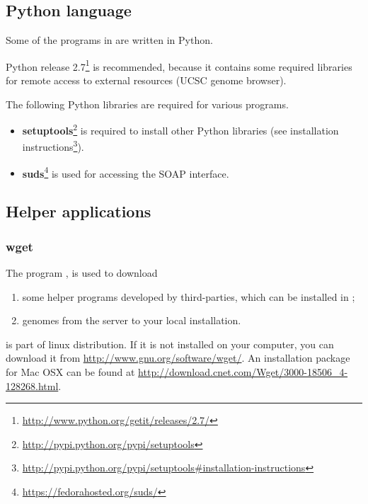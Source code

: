 \documentclass[12pt,a4paper, oneside]{scrreprt} %
\begin{document}
\subsection{Python language}

Some of the programs in \RSAT are written in Python. 

Python release
2.7\footnote{\url{http://www.python.org/getit/releases/2.7/}} is
recommended, because it contains some required libraries for remote
access to external resources (UCSC genome browser).

The following Python libraries are required for various programs.

\begin{itemize}
\item
  \textbf{setuptools}\footnote{\url{http://pypi.python.org/pypi/setuptools}}
  is required to install other Python libraries (see installation
  instructions\footnote{\url{http://pypi.python.org/pypi/setuptools\#installation-instructions}}).

\item \textbf{suds}\footnote{\url{https://fedorahosted.org/suds/}} is
  used for accessing the SOAP interface.

\end{itemize}


\subsection{Helper applications}



\subsubsection{wget}

The program , is used  to download
\begin{enumerate}

\item some helper programs developed by third-parties, which can be
  installed in \RSAT;

\item genomes from the \RSAT server to your local \RSAT installation.

\end{enumerate}

 is part of linux distribution. If it is not installed
on your computer, you can download it from
\url{http://www.gnu.org/software/wget/}.  An installation package for
Mac OSX can be found at
\url{http://download.cnet.com/Wget/3000-18506_4-128268.html}.
\end{document}
